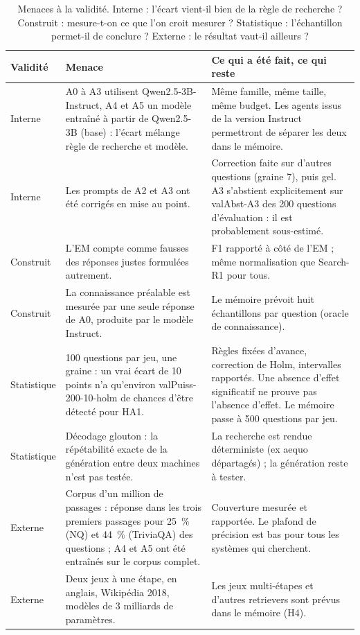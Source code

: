 \documentclass[11pt,a4paper]{article}
\newcommand{\valAbst}[1]{\csname valAbst-#1\endcsname}         %
\newcommand{\valPuiss}[3]{\csname valPuiss-#1-#2-#3\endcsname} %
\begin{document}
\begin{table}[ht]
\centering\small
\begin{tabular}{@{}p{2.1cm}p{5.2cm}p{6.6cm}@{}}
\toprule
Validité & Menace & Ce qui a été fait, ce qui reste\\
\midrule
Interne & A0 à A3 utilisent Qwen2.5-3B-Instruct, A4 et A5 un modèle entraîné à partir de Qwen2.5-3B (base) : l'écart mélange règle de recherche et modèle. & Même famille, même taille, même budget. Les agents issus de la version Instruct permettront de séparer les deux dans le mémoire.\\
Interne & Les prompts de A2 et A3 ont été corrigés en mise au point. & Correction faite sur d'autres questions (graine 7), puis gel. A3 s'abstient explicitement sur \valAbst{A3} des 200 questions d'évaluation : il est probablement sous-estimé.\\
Construit & L'EM compte comme fausses des réponses justes formulées autrement. & F1 rapporté à côté de l'EM ; même normalisation que Search-R1 pour tous.\\
Construit & La connaissance préalable est mesurée par une seule réponse de A0, produite par le modèle Instruct. & Le mémoire prévoit huit échantillons par question (oracle de connaissance).\\
Statistique & 100 questions par jeu, une graine : un vrai écart de 10 points n'a qu'environ \valPuiss{200}{10}{holm} de chances d'être détecté pour HA1. & Règles fixées d'avance, correction de Holm, intervalles rapportés. Une absence d'effet significatif ne prouve pas l'absence d'effet. Le mémoire passe à 500 questions par jeu.\\
Statistique & Décodage glouton : la répétabilité exacte de la génération entre deux machines n'est pas testée. & La recherche est rendue déterministe (ex aequo départagés) ; la génération reste à tester.\\
Externe & Corpus d'un million de passages : réponse dans les trois premiers passages pour 25~\% (NQ) et 44~\% (TriviaQA) des questions ; A4 et A5 ont été entraînés sur le corpus complet. & Couverture mesurée et rapportée. Le plafond de précision est bas pour tous les systèmes qui cherchent.\\
Externe & Deux jeux à une étape, en anglais, Wikipédia 2018, modèles de 3 milliards de paramètres. & Les jeux multi-étapes et d'autres retrievers sont prévus dans le mémoire (H4).\\
\bottomrule
\end{tabular}
\caption{Menaces à la validité. Interne : l'écart vient-il bien de la règle de recherche ? Construit : mesure-t-on ce que l'on croit mesurer ? Statistique : l'échantillon permet-il de conclure ? Externe : le résultat vaut-il ailleurs ?}
\label{tab:validite}
\end{table}
\end{document}

